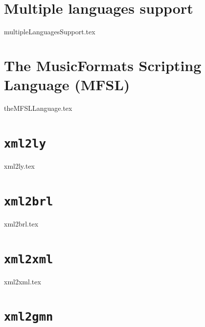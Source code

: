 \documentclass[11pt,a4paper]{report}
\begin{document}
\part{Multiple languages support}

{multipleLanguagesSupport.tex}


\part{The MusicFormats Scripting Language (MFSL)}

{theMFSLLanguage.tex}


\part{{\tt xml2ly}}

{xml2ly.tex}


\part{{\tt xml2brl}}

{xml2brl.tex}


\part{{\tt xml2xml}}

{xml2xml.tex}


\part{{\tt xml2gmn}}
\end{document}
